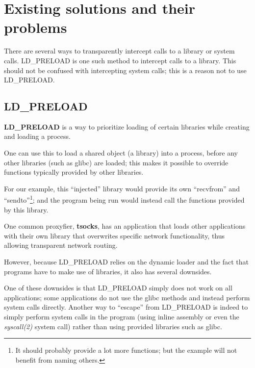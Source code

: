 \documentclass[a4paper, twoside, 10pt]{report}
\begin{document}


%

\section{Existing solutions and their problems}

There are several ways to transparently intercept calls to a library or
system calls. LD\_PRELOAD is one such method to intercept calls to a library.
This should not be confused with intercepting system calls; this is a reason
not to use LD\_PRELOAD.

\subsection{LD\_PRELOAD}

\textbf{LD\_PRELOAD} is a way to prioritize loading of certain libraries
while creating and loading a process.

One can use this to load a shared object (a library) into a process,
before any other libraries (such as glibc) are loaded;
this makes it possible to override functions typically provided by other
libraries.

For our example, this ``injected'' library would provide its own
``recvfrom'' and ``sendto''\footnote{It should probably provide
a lot more functions; but the example will not benefit from naming others.};
and the program being run would instead call the functions provided by
this library.

One common proxyfier, \textbf{tsocks}, has an application that loads
other applications with their own library that overwrites specific
network functionality, thus allowing transparent network routing.

However, because LD\_PRELOAD relies on the dynamic loader and the fact that
programs have to make use of libraries, it also has several downsides.

One of these downsides is that LD\_PRELOAD simply does not work on all
applications; some applications do not use the glibc methods and instead
perform system calls directly. Another way to ``escape'' from LD\_PRELOAD
is indeed to simply perform system calls in the program (using inline assembly
or even the \textit{syscall(2)} system call) rather than using
provided libraries such as glibc.
\end{document}
